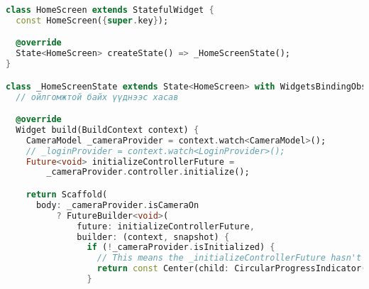 \begin{lstlisting}[language=Dart, caption=Data Spider нүүр хуудасны хэрэгжүүлэлт, frame=single]
class HomeScreen extends StatefulWidget {
  const HomeScreen({super.key});

  @override
  State<HomeScreen> createState() => _HomeScreenState();
}

class _HomeScreenState extends State<HomeScreen> with WidgetsBindingObserver {
  // ойлгомжтой байх үүднээс хасав

  @override
  Widget build(BuildContext context) {
    CameraModel _cameraProvider = context.watch<CameraModel>();
    // _loginProvider = context.watch<LoginProvider>();
    Future<void> initializeControllerFuture =
        _cameraProvider.controller.initialize();

    return Scaffold(
      body: _cameraProvider.isCameraOn
          ? FutureBuilder<void>(
              future: initializeControllerFuture,
              builder: (context, snapshot) {
                if (!_cameraProvider.isInitialized) {
                  // This means the _initializeControllerFuture hasn't been properly initialized yet
                  return const Center(child: CircularProgressIndicator());
                }


\end{lstlisting}
